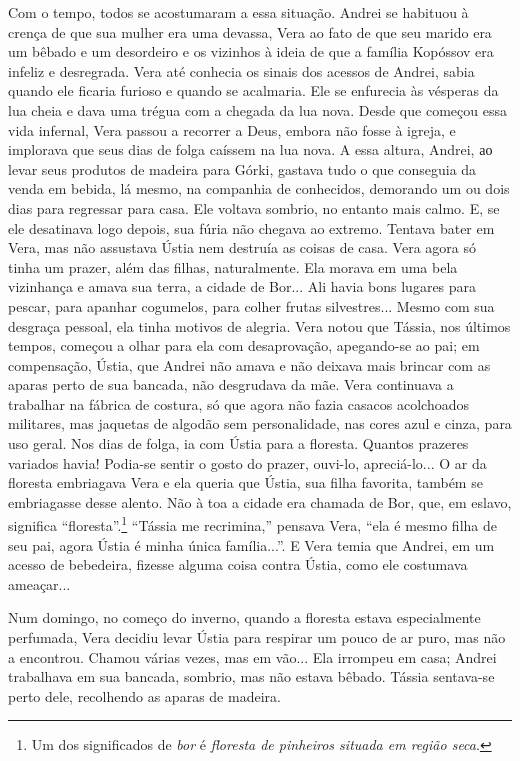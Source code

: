 Com o tempo, todos se acostumaram a essa situação. Andrei se habituou à
crença de que sua mulher era uma devassa, Vera ao fato de que seu marido
era um bêbado e um desordeiro e os vizinhos à ideia de que a família
Kopóssov era infeliz e desregrada. Vera até conhecia os sinais dos
acessos de Andrei, sabia quando ele ficaria furioso e quando se
acalmaria. Ele se enfurecia às vésperas da lua cheia e dava uma trégua
com a chegada da lua nova. Desde que começou essa vida infernal, Vera
passou a recorrer a Deus, embora não fosse à igreja, e implorava que
seus dias de folga caíssem na lua nova. A essa altura, Andrei, ао levar
seus produtos de madeira para Górki, gastava tudo o que conseguia da
venda em bebida, lá mesmo, na companhia de conhecidos, demorando um ou
dois dias para regressar para casa. Ele voltava sombrio, no entanto mais
calmo. E, se ele desatinava logo depois, sua fúria não chegava ao
extremo. Tentava bater em Vera, mas não assustava Ústia nem destruía as
coisas de casa. Vera agora só tinha um prazer, além das filhas,
naturalmente. Ela morava em uma bela vizinhança e amava sua terra, a
cidade de Bor... Ali havia bons lugares para pescar, para apanhar
cogumelos, para colher frutas silvestres... Mesmo com sua desgraça
pessoal, ela tinha motivos de alegria. Vera notou que Tássia, nos
últimos tempos, começou a olhar para ela com desaprovação, apegando-se
ao pai; em compensação, Ústia, que Andrei não amava e não deixava mais
brincar com as aparas perto de sua bancada, não desgrudava da mãe. Vera
continuava a trabalhar na fábrica de costura, só que agora não fazia
casacos acolchoados militares, mas jaquetas de algodão sem
personalidade, nas cores azul e cinza, para uso geral. Nos dias de
folga, ia com Ústia para a floresta. Quantos prazeres variados havia!
Podia-se sentir o gosto do prazer, ouvi-lo, apreciá-lo... O ar da
floresta embriagava Vera e ela queria que Ústia, sua filha favorita,
também se embriagasse desse alento. Não à toa a cidade era chamada de
Bor, que, em eslavo, significa ``floresta''.\footnote{Um dos
  significados de \emph{bor} é \emph{floresta de pinheiros situada em
  região seca}.} ``Tássia me recrimina,'' pensava Vera, ``ela é mesmo
filha de seu pai, agora Ústia é minha única família...''. E Vera temia
que Andrei, em um acesso de bebedeira, fizesse alguma coisa contra
Ústia, como ele costumava ameaçar...

Num domingo, no começo do inverno, quando a floresta estava
especialmente perfumada, Vera decidiu levar Ústia para respirar um pouco
de ar puro, mas não a encontrou. Chamou várias vezes, mas em vão... Ela
irrompeu em casa; Andrei trabalhava em sua bancada, sombrio, mas não
estava bêbado. Tássia sentava-se perto dele, recolhendo as aparas de
madeira.

